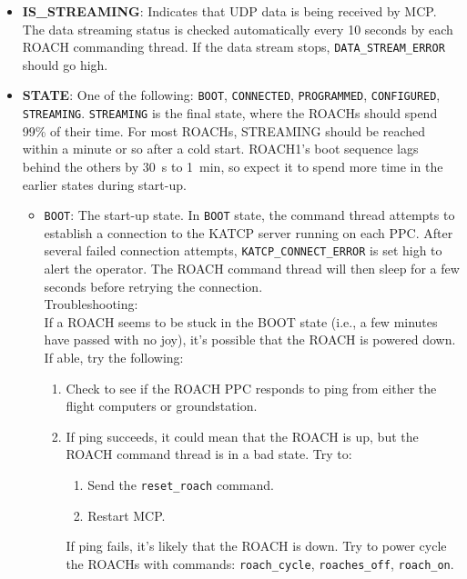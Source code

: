 \begin{itemize}[leftmargin=*,label={}]

\item \textbf{IS\_STREAMING}: Indicates that UDP data is being received by MCP\@. The data streaming status is checked automatically every 10 seconds by each ROACH commanding thread. If the data stream stops, \texttt{DATA\_STREAM\_ERROR} should go high.

\item \textbf{STATE}: One of the following: \texttt{BOOT}, \texttt{CONNECTED}, \texttt{PROGRAMMED}, \texttt{CONFIGURED}, \texttt{STREAMING}. \texttt{STREAMING} is the final state, where the ROACHs should spend 99\% of their time. For most ROACHs, STREAMING should be reached within a minute or so after a cold start. ROACH1’s boot sequence lags behind the others by 30~s to 1~min, so expect it to spend more time in the earlier states during start-up.

\begin{itemize}
    \item \texttt{BOOT}: The start-up state. In \texttt{BOOT} state, the command thread attempts to establish a connection to the KATCP server running on each PPC\@. After several failed connection attempts, \texttt{KATCP\_CONNECT\_ERROR} is set high to alert the operator. The ROACH command thread will then sleep for a few seconds before retrying the connection.\\
    Troubleshooting:\\
    If a ROACH seems to be stuck in the BOOT state (i.e., a few minutes have passed with no joy), it’s possible that the ROACH is powered down. If able, try the following:
    \begin{enumerate}
      \item Check to see if the ROACH PPC responds to ping from either the flight computers or groundstation.
      \item If ping succeeds, it could mean that the ROACH is up, but the ROACH command thread is in a bad state. Try to:
        \begin{enumerate}
          \item Send the \texttt{reset\_roach} command.
          \item Restart MCP\@.
        \end{enumerate}
       If ping fails, it’s likely that the ROACH is down. Try to power cycle the ROACHs with commands: \texttt{roach\_cycle}, \texttt{roaches\_off}, \texttt{roach\_on}.
    \end{enumerate}


\end{itemize}
\end{itemize}
